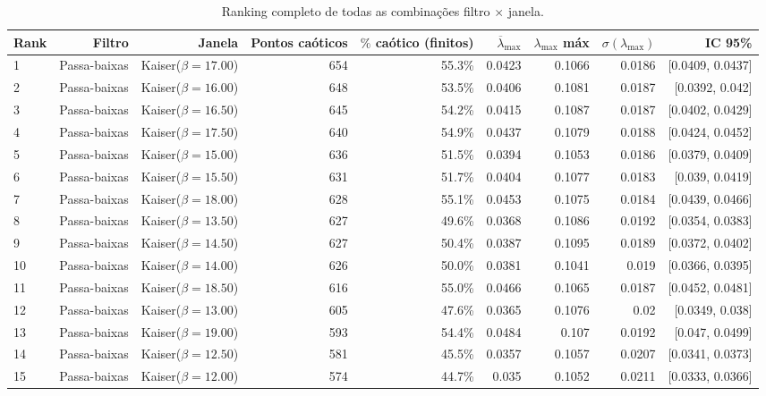   \begin{longtable}{lrrrrrrrr}
    \caption{Ranking completo de todas as combinações filtro $\times$ janela.} \\
    \toprule
    Rank & Filtro & Janela & Pontos caóticos & $\%$ caótico (finitos) & $\overline{\lambda}_{\max}$ & $\lambda_{\max}$ máx & $\sigma(\lambda_{\max})$ & IC 95\% \\
    \midrule
    1 & Passa-baixas & Kaiser($\beta=17.00$) & 654 & 55.3\% & 0.0423 & 0.1066 & 0.0186 & [0.0409, 0.0437] \\
    2 & Passa-baixas & Kaiser($\beta=16.00$) & 648 & 53.5\% & 0.0406 & 0.1081 & 0.0187 & [0.0392, 0.042] \\
    3 & Passa-baixas & Kaiser($\beta=16.50$) & 645 & 54.2\% & 0.0415 & 0.1087 & 0.0187 & [0.0402, 0.0429] \\
    4 & Passa-baixas & Kaiser($\beta=17.50$) & 640 & 54.9\% & 0.0437 & 0.1079 & 0.0188 & [0.0424, 0.0452] \\
    5 & Passa-baixas & Kaiser($\beta=15.00$) & 636 & 51.5\% & 0.0394 & 0.1053 & 0.0186 & [0.0379, 0.0409] \\
    6 & Passa-baixas & Kaiser($\beta=15.50$) & 631 & 51.7\% & 0.0404 & 0.1077 & 0.0183 & [0.039, 0.0419] \\
    7 & Passa-baixas & Kaiser($\beta=18.00$) & 628 & 55.1\% & 0.0453 & 0.1075 & 0.0184 & [0.0439, 0.0466] \\
    8 & Passa-baixas & Kaiser($\beta=13.50$) & 627 & 49.6\% & 0.0368 & 0.1086 & 0.0192 & [0.0354, 0.0383] \\
    9 & Passa-baixas & Kaiser($\beta=14.50$) & 627 & 50.4\% & 0.0387 & 0.1095 & 0.0189 & [0.0372, 0.0402] \\
    10 & Passa-baixas & Kaiser($\beta=14.00$) & 626 & 50.0\% & 0.0381 & 0.1041 & 0.019 & [0.0366, 0.0395] \\
    11 & Passa-baixas & Kaiser($\beta=18.50$) & 616 & 55.0\% & 0.0466 & 0.1065 & 0.0187 & [0.0452, 0.0481] \\
    12 & Passa-baixas & Kaiser($\beta=13.00$) & 605 & 47.6\% & 0.0365 & 0.1076 & 0.02 & [0.0349, 0.038] \\
    13 & Passa-baixas & Kaiser($\beta=19.00$) & 593 & 54.4\% & 0.0484 & 0.107 & 0.0192 & [0.047, 0.0499] \\
    14 & Passa-baixas & Kaiser($\beta=12.50$) & 581 & 45.5\% & 0.0357 & 0.1057 & 0.0207 & [0.0341, 0.0373] \\
    15 & Passa-baixas & Kaiser($\beta=12.00$) & 574 & 44.7\% & 0.035 & 0.1052 & 0.0211 & [0.0333, 0.0366] \\

\end{longtable}

